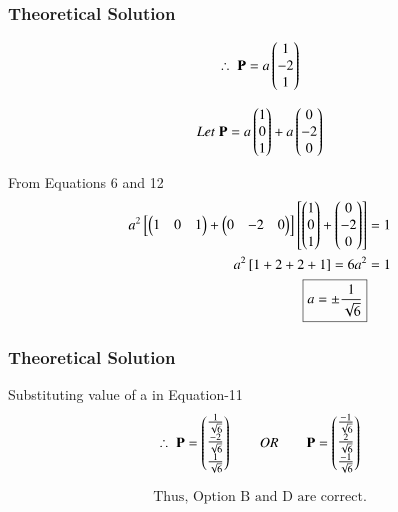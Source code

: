 \documentclass{beamer}
\begin{document}
\begin{frame}[fragile]
    \frametitle{Theoretical Solution}
\begin{equation}
  \therefore \;  \mathbf{P} = a\begin{pmatrix}1 \\ -2 \\ 1\end{pmatrix}
\end{equation}

\begin{equation}
    Let \; \mathbf{P} = a\begin{pmatrix}1 \\ 0 \\ 1\end{pmatrix} + a\begin{pmatrix}0 \\ -2 \\ 0\end{pmatrix}
\end{equation}

From Equations 6 and 12
\begin{align}
   a^2 \left[\begin{pmatrix}1 & 0 & 1\end{pmatrix} + \begin{pmatrix}0 & -2 & 0\end{pmatrix}\right] \left[\begin{pmatrix}1 \\ 0 \\ 1\end{pmatrix} + \begin{pmatrix}0 \\ -2 \\ 0\end{pmatrix}\right] &= 1 \\ 
   a^2\left[ 1 + 2 + 2 + 1 \right] = 6a^2 &= 1\\
   \boxed{a = \pm \dfrac{1}{\sqrt{6}}}
\end{align}
\end{frame}

\begin{frame}[fragile]
    \frametitle{Theoretical Solution}
    Substituting value of a in Equation-11
\begin{align}
    \therefore \; \mathbf{P} = \begin{pmatrix}\frac{1}{\sqrt{6}} \\ \frac{-2}{\sqrt{6}} \\ \frac{1}{\sqrt{6}}\end{pmatrix} 
     \qquad OR \qquad
    \mathbf{P} = \begin{pmatrix}\frac{-1}{\sqrt{6}} \\ \frac{2}{\sqrt{6}} \\ \frac{-1}{\sqrt{6}}\end{pmatrix}
    \end{align}

\begin{align*}
    \boxed{\text{Thus, Option B and D are correct.}}
\end{align*}
\end{frame}
\end{document}
